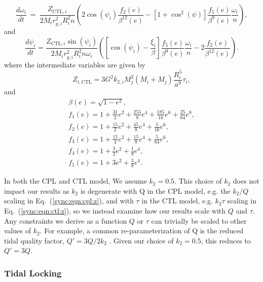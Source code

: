 \begin{equation}\label{sync:eqn:ctl:omega}
  \frac{d\omega_i}{dt} \ = \ \frac{Z_{\mathrm{CTL},i}}{2 M_i r_{g,i}^2 
R_i^2 n} \left( 2 \cos(\psi_i) \frac{f_2(e)}{\beta^{12}(e)} - \left[ 1+\cos^2(\psi)
 \right] \frac{f_5(e)}{\beta^9(e)} 
\frac{\omega_i}{n} \right),  
\end{equation}
and
\begin{equation}\label{sync:eqn:ctl:psi}
  \frac{d\psi_i}{dt} = \frac{Z_{\mathrm{CTL},i} \sin(\psi_i)}{2 M_i r_{g,i}^2 R_i^2 n \omega_i}\left( \left[ \cos(\psi_i) - \frac{\xi_i}{ \beta} \right] \frac{f_5(e)}{\beta^9(e)} \frac{\omega_i}{n} - 2 \frac{f_2(e)}{\beta^{12}(e)} \right).
\end{equation}
\normalsize
where the intermediate variables are given by 
\begin{equation}\label{sync:eqn:ctl:z}
 Z_{i,\mathrm{CTL}} = 3 G^2 k_{2,i} M_j^2 (M_i+M_j) \frac{R_i^5}{a^9} \tau_i ,
\end{equation}
and 
\begin{equation}\label{sync:eqn:ctl:f_e}
\begin{array}{l}
\beta(e) = \sqrt{1-e^2},\\
f_1(e) = 1 + \frac{31}{2} e^2 + \frac{255}{8} e^4 + \frac{185}{16} e^6 + \frac{25}{
64} e^8,\\
f_2(e) = 1 + \frac{15}{2} e^2 + \frac{45}{8} e^4 + \frac{5}{16} e^6,\\
f_3(e) = 1 + \frac{15}{4} e^2 + \frac{15}{8} e^4 + \frac{5}{64} e^6,\\
f_4(e) = 1 + \frac{3}{2} e^2 + \frac{1}{8} e^4,\\
f_5(e) = 1 + 3 e^2 + \frac{3}{8} e^4.
\end{array}
\end{equation}

In both the CPL and CTL model, We assume $k_2 = 0.5$. This choice of $k_2$ does not impact our results as $k_2$ is degenerate with Q in the CPL model, e.g. the $k_2/Q$ scaling in Eq.~(\ref{sync:eqn:cpl:z}), and with $\tau$ in the CTL model, e.g. $k_2 \tau$ scaling in Eq.~(\ref{sync:eqn:ctl:z}), so we instead examine how our results scale with $Q$ and $\tau$.  Any constraints we derive as a function $Q$ or $\tau$ can trivially be scaled to other values of $k_2$. For example, a common re-parameterization of Q is the reduced tidal quality factor, $Q' = 3Q/2k_2$ \citep[e.g.][]{Leconte2010}. Given our choice of $k_2 = 0.5$, this reduces to $Q' = 3 Q$.

\subsubsection{Tidal Locking}

